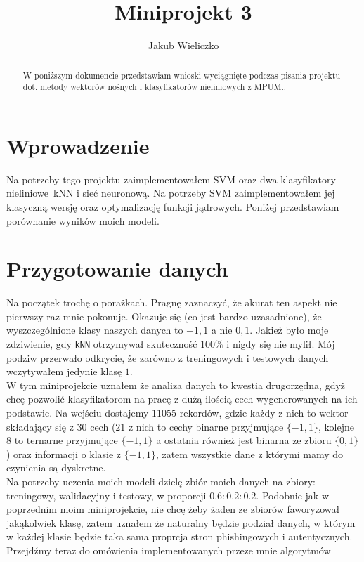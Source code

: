 \documentclass[polish,12pt,a4paper]{extarticle}
\title{Miniprojekt 3}
\author{Jakub Wieliczko}
\begin{document}
\begin{abstract}
W poniższym dokumencie przedstawiam wnioski wyciągnięte podczas pisania projektu dot. metody wektorów nośnych i klasyfikatorów nieliniowych z MPUM..
\end{abstract}
\section*{Wprowadzenie}
Na potrzeby tego projektu zaimplementowałem SVM oraz dwa klasyfikatory nieliniowe \textendash\,kNN i sieć neuronową. Na potrzeby SVM zaimplementowałem jej klasyczną wersję oraz optymalizację funkcji jądrowych. Poniżej przedstawiam porównanie wyników moich modeli.

\section*{Przygotowanie danych}
Na początek trochę o porażkach. Pragnę zaznaczyć, że akurat ten aspekt nie pierwszy raz mnie pokonuje. Okazuje się (co jest bardzo uzasadnione), że wyszczególnione klasy naszych danych to ${-1, 1}$ a nie ${0, 1}$. Jakież było moje zdziwienie, gdy \texttt{kNN} otrzymywał skuteczność $100\%$ i nigdy się nie mylił. Mój podziw przerwało odkrycie, że zarówno z treningowych i testowych danych wczytywałem jedynie klasę $1$.\smallskip\\
W tym miniprojekcie uznałem że analiza danych to kwestia drugorzędna, gdyż chcę pozwolić klasyfikatorom na pracę z dużą ilością cech wygenerowanych na ich podstawie. Na wejściu dostajemy $11055$ rekordów, gdzie każdy z nich to wektor składający się z $30$ cech ($21$ z nich to cechy binarne przyjmujące $\{-1, 1\}$, kolejne $8$ to ternarne przyjmujące $\{-1, 1\}$ a ostatnia również jest binarna ze zbioru $\{0, 1\}$) oraz informacji o klasie z $\{-1, 1\}$, zatem wszystkie dane z którymi mamy do czynienia są dyskretne. \smallskip \\
Na potrzeby uczenia moich modeli dzielę zbiór moich danych na zbiory: treningowy, walidacyjny i testowy, w proporcji $0.6 : 0.2 : 0.2$. Podobnie jak w poprzednim moim miniprojekcie, nie chcę żeby żaden ze zbiorów faworyzował jakąkolwiek klasę, zatem uznałem że naturalny będzie podział danych, w którym w każdej klasie będzie taka sama proprcja stron phishingowych i autentycznych. Przejdźmy teraz do omówienia implementowanych przeze mnie algorytmów
\end{document}
